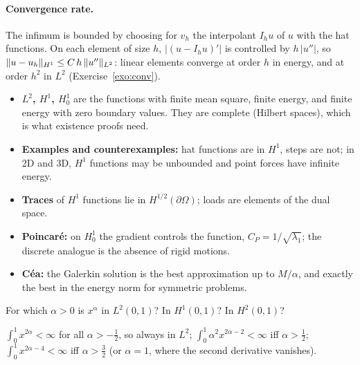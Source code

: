 \paragraph{Convergence rate.} The infimum is bounded by choosing for $v_h$ the
interpolant $I_hu$ of $u$ with the hat functions. On each element of size
$h$, $|(u-I_hu)'|$ is controlled by $h\,|u''|$, so
$\lVert u-u_h\rVert_{H^1}\le C\,h\,\lVert u''\rVert_{L^2}$: linear elements converge at
order $h$ in energy, and at order $h^2$ in $L^2$ (Exercise~\ref{exo:conv}).

\begin{gbox*}
\begin{itemize}
  \item \textbf{$L^2$, $H^1$, $H^1_0$} are the functions with finite mean
  square, finite energy, and finite energy with zero boundary values. They
  are complete (Hilbert spaces), which is what existence proofs need.
  \item \textbf{Examples and counterexamples:} hat functions are in $H^1$,
  steps are not; in 2D and 3D, $H^1$ functions may be unbounded and point
  forces have infinite energy.
  \item \textbf{Traces} of $H^1$ functions lie in $H^{1/2}(\partial\Omega)$;
  loads are elements of the dual space.
  \item \textbf{Poincar\'e:} on $H^1_0$ the gradient controls the function,
  $C_P=1/\sqrt{\lambda_1}$; the discrete analogue is the absence of rigid
  motions.
  \item \textbf{C\'ea:} the Galerkin solution is the best approximation up to
  $M/\alpha$, and exactly the best in the energy norm for symmetric problems.
\end{itemize}
\end{gbox*}


\label{exo:sp-powers}
For which $\alpha>0$ is $x^\alpha$ in $L^2(0,1)$? In $H^1(0,1)$? In
$H^2(0,1)$?
\begin{solution}
$\displaystyle \int_0^1x^{2\alpha}<\infty$ for all $\alpha>-\tfrac12$, so always in $L^2$;
$\displaystyle \int_0^1\alpha^2x^{2\alpha-2}<\infty$ iff $\alpha>\tfrac12$;
$\displaystyle \int_0^1x^{2\alpha-4}<\infty$ iff $\alpha>\tfrac32$ (or $\alpha=1$, where the
second derivative vanishes).
\end{solution}

